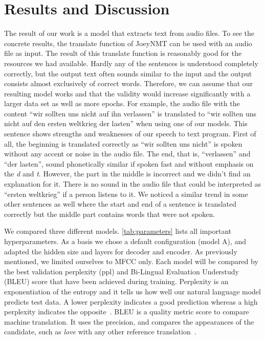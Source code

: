 \documentclass[11pt,a4paper]{article}
\begin{document}
\section{Results and Discussion}
The result of our work is a model that extracts text from audio files. 
To see the concrete results, the translate function of JoeyNMT can be used with an audio file as input.
The result of this translate function is reasonably good for the resources we had available.
Hardly any of the sentences is understood completely correctly, but the output text often sounds similar to the input and the output consists almost exclusively of correct words.
Therefore, we can assume that our resulting model works and that the validity would increase significantly with a larger data set as well as more epochs.
For example, the audio file with the content \enquote{wir sollten uns nicht auf ihn verlassen} is translated to \enquote{wir sollten uns nicht auf den ersten weltkrieg der lasten} when using one of our models.
This sentence shows strengths and weaknesses of our speech to text program.
First of all, the beginning is translated correctly as \enquote{wir sollten uns nicht} is spoken without any accent or noise in the audio file.
The end, that is, \enquote{verlassen} and \enquote{der lasten}, sound phonetically similar if spoken fast and without emphasis on the \textit{d} and \textit{t}.
However, the part in the middle is incorrect and we didn't find an explanation for it.
There is no sound in the audio file that could be interpreted as \enquote{ersten weltkrieg} if a person listens to it.
We noticed a similar trend in some other sentences as well where
the start and end of a sentence is translated correctly but the middle part contains words that were not spoken.


We compared three different models.
\autoref{tab:parameters} lists all important hyperparameters.
As a basis we chose a default configuration (model A), and adapted the hidden size and layers for decoder and encoder.
As previously mentioned, we limited ourselves to MFCC only.
Each model will be compared by the best validation perplexity (ppl) and Bi-Lingual Evaluation Understudy (BLEU) score that have been achieved during training.
Perplexity is an exponentiation of the entropy and it tells us how well our natural language model predicts test data.
A lower perplexity indicates a good prediction whereas a high perplexity indicates the opposite~\cite{jozefowicz2016exploring}.
BLEU is a quality metric score to compare machine translation.
It uses the precision, and compares the appearances of the candidate, such as \textit{love} with any other reference translation~\cite{Papineni2002}.
\end{document}
